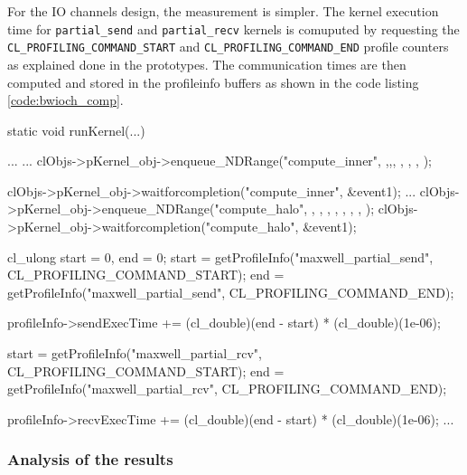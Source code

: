 



For the IO channels design, the measurement is simpler. The kernel execution time
for \texttt{partial\_send} and \texttt{partial\_recv} kernels is comuputed by requesting
the \texttt{CL\_PROFILING\_COMMAND\_START} and \texttt{CL\_PROFILING\_COMMAND\_END} profile counters
as explained done in the prototypes. The communication times are then computed and stored
in the profileinfo buffers as shown in the code listing \ref{code:bwioch_comp}.
\begin{CppCode}[caption=Send and receive communication time computation changes for IO channels designs, frame=tlrb, label=code:bwioch_comp]
static void runKernel(...)
{
...
...
    clObjs->pKernel_obj->enqueue_NDRange("compute_inner",  ,,, , , , );

    clObjs->pKernel_obj->waitforcompletion("compute_inner", &event1);
...
    clObjs->pKernel_obj->enqueue_NDRange("compute_halo", , , , , , , , );
    clObjs->pKernel_obj->waitforcompletion("compute_halo", &event1);

    cl_ulong start = 0, end = 0;
    start = getProfileInfo("maxwell_partial_send", CL_PROFILING_COMMAND_START);
    end = getProfileInfo("maxwell_partial_send", CL_PROFILING_COMMAND_END);

    profileInfo->sendExecTime += (cl_double)(end - start) * (cl_double)(1e-06);

    start = getProfileInfo("maxwell_partial_rcv", CL_PROFILING_COMMAND_START);
    end = getProfileInfo("maxwell_partial_rcv", CL_PROFILING_COMMAND_END);

    profileInfo->recvExecTime += (cl_double)(end - start) * (cl_double)(1e-06);
...
}
\end{CppCode}


\subsubsection{Analysis of the results}

